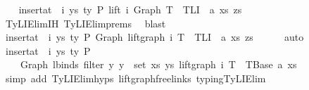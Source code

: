 \begin{isabellebody}
\ \ \isamarkupfalse%
\ {\isachardoublequoteopen}insert{\isacharunderscore}{\kern0pt}at\ {\isasymGamma}\ i\ {\isacharparenleft}{\kern0pt}ys{\isacharcomma}{\kern0pt}\ ty{}{\isacharparenright}{\kern0pt}\ {\isasymturnstile}{\isacharbraceleft}{\kern0pt}P{\isacharbraceright}{\kern0pt}\ lift\ i\ {\isacharparenleft}{\kern0pt}Graph\ T{\isacharparenright}{\kern0pt}\ {\isacharcolon}{\kern0pt}\ TLI\ {\isacharbraceleft}{\kern0pt}{\isacharhash}{\kern0pt}{\isacharbraceright}{\kern0pt}\ a\ xs\ zs{\isachardoublequoteclose}\isanewline
\ \ \ \ \isamarkupfalse%
\ TyLIElim{}{\isachardot}{\kern0pt}IH\ TyLIElim{}{\isachardot}{\kern0pt}prems\ \isamarkupfalse%
\ blast\isanewline
\ \ \isamarkupfalse%
\ \isamarkupfalse%
\ {\isachardoublequoteopen}insert{\isacharunderscore}{\kern0pt}at\ {\isasymGamma}\ i\ {\isacharparenleft}{\kern0pt}ys{\isacharcomma}{\kern0pt}\ ty{}{\isacharparenright}{\kern0pt}\ {\isasymturnstile}{\isacharbraceleft}{\kern0pt}P{\isacharbraceright}{\kern0pt}\ Graph\ {\isacharparenleft}{\kern0pt}lift{\isacharunderscore}{\kern0pt}graph\ i\ T{\isacharparenright}{\kern0pt}\ {\isacharcolon}{\kern0pt}\ TLI\ {\isacharbraceleft}{\kern0pt}{\isacharhash}{\kern0pt}{\isacharbraceright}{\kern0pt}\ a\ xs\ zs{\isachardoublequoteclose}\isanewline
\ \ \ \ \isamarkupfalse%
\ auto\isanewline
\ \ \isamarkupfalse%
\ \isamarkupfalse%
\ {\isachardoublequoteopen}insert{\isacharunderscore}{\kern0pt}at\ {\isasymGamma}\ i\ {\isacharparenleft}{\kern0pt}ys{\isacharcomma}{\kern0pt}\ ty{}{\isacharparenright}{\kern0pt}\ {\isasymturnstile}{\isacharbraceleft}{\kern0pt}P{\isacharbraceright}{\kern0pt}\isanewline
\ \ \ \ Graph\ {\isacharparenleft}{\kern0pt}lbinds\ {\isacharparenleft}{\kern0pt}filter\ {\isacharparenleft}{\kern0pt}{\isasymlambda}y{\isachardot}{\kern0pt}\ y\ {\isasymnotin}\ set\ xs{\isacharparenright}{\kern0pt}\ ys{\isacharprime}{\kern0pt}{\isacharparenright}{\kern0pt}\ {\isacharparenleft}{\kern0pt}lift{\isacharunderscore}{\kern0pt}graph\ i\ T{\isacharparenright}{\kern0pt}{\isacharparenright}{\kern0pt}\ {\isacharcolon}{\kern0pt}\ TBase\ a\ xs{\isachardoublequoteclose}\isanewline
\ \ \ \ \isamarkupfalse%
\ {\isacharparenleft}{\kern0pt}simp\ add{\isacharcolon}{\kern0pt}\ TyLIElim{}{\isachardot}{\kern0pt}hyps{\isacharparenleft}{\kern0pt}{}{\isacharcomma}{\kern0pt}{}{\isacharparenright}{\kern0pt}\ lift{\isacharunderscore}{\kern0pt}graph{\isacharunderscore}{\kern0pt}freelinks\ typing{\isachardot}{\kern0pt}TyLIElim{}{\isacharparenright}{\kern0pt}\isanewline

\end{isabellebody}
